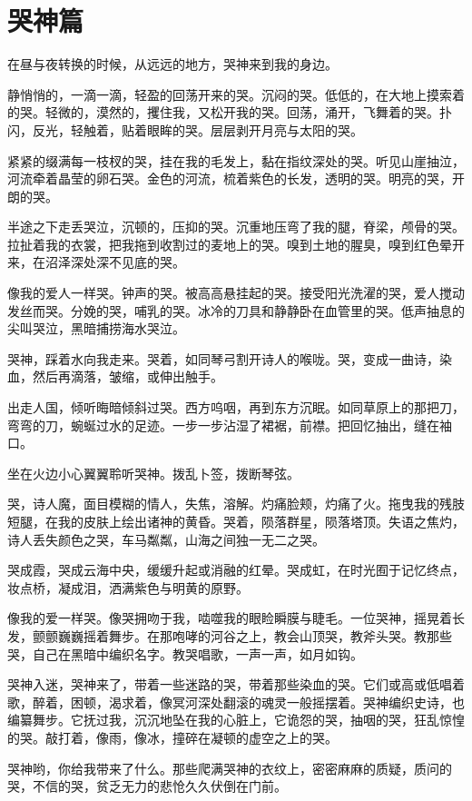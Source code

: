 \documentclass[UTF8]{article}
\begin{document}
\section{哭神篇}
\par 在昼与夜转换的时候，从远远的地方，哭神来到我的身边。
\par 静悄悄的，一滴一滴，轻盈的回荡开来的哭。沉闷的哭。低低的，在大地上摸索着的哭。轻微的，漠然的，攫住我，又松开我的哭。回荡，涌开，飞舞着的哭。扑闪，反光，轻触着，贴着眼眸的哭。层层剥开月亮与太阳的哭。
\par 紧紧的缀满每一枝杈的哭，挂在我的毛发上，黏在指纹深处的哭。听见山崖抽泣，河流牵着晶莹的卵石哭。金色的河流，梳着紫色的长发，透明的哭。明亮的哭，开朗的哭。
\par 半途之下走丢哭泣，沉顿的，压抑的哭。沉重地压弯了我的腿，脊梁，颅骨的哭。拉扯着我的衣裳，把我拖到收割过的麦地上的哭。嗅到土地的腥臭，嗅到红色晕开来，在沼泽深处深不见底的哭。
\par 像我的爱人一样哭。钟声的哭。被高高悬挂起的哭。接受阳光洗濯的哭，爱人搅动发丝而哭。分娩的哭，哺乳的哭。冰冷的刀具和静静卧在血管里的哭。低声抽息的尖叫哭泣，黑暗捕捞海水哭泣。
\par 哭神，踩着水向我走来。哭着，如同琴弓割开诗人的喉咙。哭，变成一曲诗，染血，然后再滴落，皱缩，或伸出触手。
\par 出走人国，倾听晦暗倾斜过哭。西方呜咽，再到东方沉眠。如同草原上的那把刀，弯弯的刀，蜿蜒过水的足迹。一步一步沾湿了裙裾，前襟。把回忆抽出，缝在袖口。
\par 坐在火边小心翼翼聆听哭神。拨乱卜签，拨断琴弦。
\par 哭，诗人魔，面目模糊的情人，失焦，溶解。灼痛脸颊，灼痛了火。拖曳我的残肢短腿，在我的皮肤上绘出诸神的黄昏。哭着，陨落群星，陨落塔顶。失语之焦灼，诗人丢失颜色之哭，车马粼粼，山海之间独一无二之哭。
\par 哭成霞，哭成云海中央，缓缓升起或消融的红晕。哭成虹，在时光囿于记忆终点，妆点桥，凝成泪，洒满紫色与明黄的原野。
\par 像我的爱一样哭。像哭拥吻于我，啮噬我的眼睑瞬膜与睫毛。一位哭神，摇晃着长发，颤颤巍巍摇着舞步。在那咆哮的河谷之上，教会山顶哭，教斧头哭。教那些哭，自己在黑暗中编织名字。教哭唱歌，一声一声，如月如钩。
\par 哭神入迷，哭神来了，带着一些迷路的哭，带着那些染血的哭。它们或高或低唱着歌，醉着，困顿，渴求着，像冥河深处翻滚的魂灵一般摇摆着。哭神编织史诗，也编纂舞步。它抚过我，沉沉地坠在我的心脏上，它诡怨的哭，抽咽的哭，狂乱惊惶的哭。敲打着，像雨，像冰，撞碎在凝顿的虚空之上的哭。
\par 哭神哟，你给我带来了什么。那些爬满哭神的衣纹上，密密麻麻的质疑，质问的哭，不信的哭，贫乏无力的悲怆久久伏倒在门前。
\end{document}
